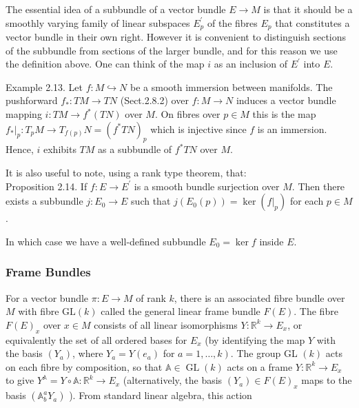 \documentclass[10pt, letterpaper]{article}
\begin{document}
The essential idea of a subbundle of a vector bundle $E \rightarrow M$ is that it should be a smoothly varying family of linear subspaces $E_{p}^{\prime}$ of the fibres $E_{p}$ that constitutes a vector bundle in their own right. However it is convenient to distinguish sections of the subbundle from sections of the larger bundle, and for this reason we use the definition above. One can think of the map $i$ as an inclusion of $E^{\prime}$ into $E$.

Example 2.13. Let $f: M \hookrightarrow N$ be a smooth immersion between manifolds. The pushforward $f_{*}: T M \rightarrow T N$ (Sect.2.8.2) over $f: M \rightarrow N$ induces a vector bundle mapping $i: T M \rightarrow f^{*}(T N)$ over $M$. On fibres over $p \in M$ this is the map $\left.f_{*}\right|_{p}: T_{p} M \rightarrow T_{f(p)} N=\left(f^{*} T N\right)_{p}$ which is injective since $f$ is an immersion. Hence, $i$ exhibits $T M$ as a subbundle of $f^{*} T N$ over $M$.

It is also useful to note, using a rank type theorem, that:\\
Proposition 2.14. If $f: E \rightarrow E^{\prime}$ is a smooth bundle surjection over $M$. Then there exists a subbundle $j: E_{0} \rightarrow E$ such that $j\left(E_{0}(p)\right)=\operatorname{ker}\left(\left.f\right|_{p}\right)$ for each $p \in M$.

In which case we have a well-defined subbundle $E_{0}=\operatorname{ker} f$ inside $E$.

\subsubsection*{Frame Bundles}
For a vector bundle $\pi: E \rightarrow M$ of rank $k$, there is an associated fibre bundle over $M$ with fibre $\mathrm{GL}(k)$ called the general linear frame bundle $F(E)$. The fibre $F(E)_{x}$ over $x \in M$ consists of all linear isomorphisms $Y: \mathbb{R}^{k} \rightarrow E_{x}$, or equivalently the set of all ordered bases for $E_{x}$ (by identifying the map $Y$ with\\
the basis $\left(Y_{a}\right)$, where $Y_{a}=Y\left(e_{a}\right)$ for $\left.a=1, \ldots, k\right)$. The group GL $(k)$ acts on each fibre by composition, so that $\mathbb{A} \in \operatorname{GL}(k)$ acts on a frame $Y: \mathbb{R}^{k} \rightarrow E_{x}$ to give $Y^{\mathbb{A}}=Y \circ \mathbb{A}: \mathbb{R}^{k} \rightarrow E_{x}$ (alternatively, the basis $\left(Y_{a}\right) \in F(E)_{x}$ maps to the basis $\left(\mathbb{A}_{b}^{a} Y_{a}\right)$ ). From standard linear algebra, this action
\end{document}
